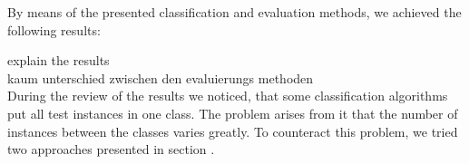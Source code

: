 By means of the presented classification and evaluation methods, we achieved the following results:
\begin{table}[h]
\label{table:resultsClassifiers}
\end{table}



explain the results\\
kaum unterschied zwischen den evaluierungs methoden\\



During the review of the results we noticed, that some classification algorithms put all test instances in one class. The problem arises from it that the number of instances between the classes varies greatly. To counteract this problem, we tried two approaches presented in section .

